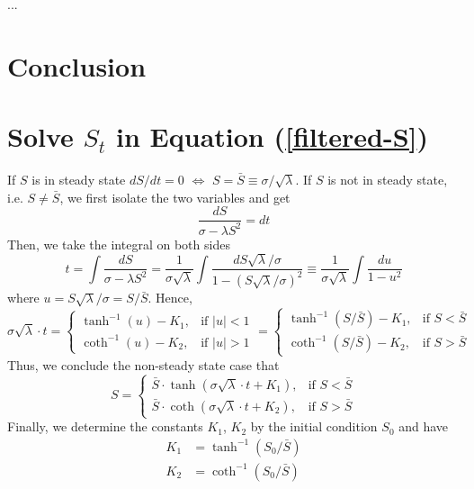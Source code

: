\documentclass[a4paper, 11pt]{article}
\theoremstyle{plain} %
\begin{document}
...


\newpage
\section{Conclusion}

\newpage


\newpage
\appendix
\small






\section{Solve $S_t$ in Equation (\ref{filtered-S})}\label{app-S-equ}

If $S$ is in steady state $dS/dt = 0$ $\Leftrightarrow$ $S = \bar{S} \equiv \sigma/\sqrt{\lambda}$. 
If $S$ is not in steady state, i.e. $S\not=\bar{S}$, we first isolate the two variables and get 
\begin{equation*}
	\frac{dS}{\sigma-\lambda S^2} = dt
\end{equation*}
Then, we take the integral on both sides
\begin{equation*}
    t = \int \frac{dS}{\sigma-\lambda S^2} = \frac{1}{\sigma\sqrt{\lambda}} \int \frac{dS\sqrt{\lambda}/\sigma}{1 - (S\sqrt{\lambda}/\sigma)^2} \equiv \frac{1}{\sigma\sqrt{\lambda}}\int \frac{du}{1-u^2} 
\end{equation*}
where $u = S\sqrt{\lambda}/\sigma = S/\bar{S}$. Hence, 
\begin{equation*}
    \sigma\sqrt{\lambda}\cdot t = \begin{cases}
        \tanh^{-1}(u)-K_1, & \text{if } |u|<1\\
        \coth^{-1}(u)-K_2, & \text{if } |u|>1
    \end{cases} = \begin{cases}
        \tanh^{-1}(S/\bar{S})-K_1, & \text{if } S<\bar{S}\\
        \coth^{-1}(S/\bar{S})-K_2, & \text{if } S>\bar{S} 
\end{cases}
\end{equation*}
Thus, we conclude the non-steady state case that 
\begin{equation*}
	S = \begin{cases}
		\bar{S}\cdot\tanh(\sigma\sqrt{\lambda}\cdot t + K_1), & \text{if } S<\bar{S}\\
		\bar{S}\cdot\coth(\sigma\sqrt{\lambda}\cdot t + K_2), & \text{if } S>\bar{S} 
	\end{cases}
\end{equation*}
Finally, we determine the constants $K_1$, $K_2$ by the initial condition $S_0$ and have 
\begin{align*}
	K_1 &= \tanh^{-1}(S_0/\bar{S})\\
	K_2 &= \coth^{-1}(S_0/\bar{S})
\end{align*}
\end{document}
